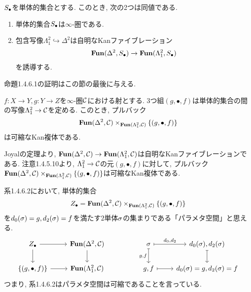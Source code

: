 \documentclass[uplatex, a4paper, 14Q, dvipdfmx]{jsreport}
\begin{document}
\begin{theorem}[Joyal]
  $\S$を単体的集合とする. 
  このとき, 次の2つは同値である. 
  \begin{enumerate}
    \item 単体的集合$\S$は$\infty$-圏である. 
    \item 包含写像$\Lambda^2_1 \hookrightarrow \Delta^2$は自明なKanファイブレーション
    \begin{align*}
      \fun(\Delta^2,\S) \to \fun(\Lambda^2_1,\S)
    \end{align*}
    を誘導する.
  \end{enumerate}
\end{theorem}

命題1.4.6.1の証明はこの節の最後に与える. 

\begin{cor}
  $f: X \to Y, g: Y \to Z$を$\infty$-圏$\calC$における射とする. 
  3つ組$(g,\bullet,f)$は単体的集合の間の写像$\Lambda^2_1 \to \calC$を定める. 
  このとき, プルバック 
  \begin{align*}
    \fun(\Delta^2,\calC) \ti_{\fun(\Lambda^2_1,\calC)} \{(g,\bullet,f)\}
  \end{align*}
  は可縮なKan複体である.
\end{cor}

\begin{Proof}
  Joyalの定理より, $\fun(\Delta^2,\calC) \to \fun(\Lambda^2_1,\calC)$は自明なKanファイブレーションである.
  注意1.4.5.10より, $\Lambda^2_1 \to \calC$の元$(g,\bullet,f)$に対して, プルバック$\fun(\Delta^2,\calC) \ti_{\fun(\Lambda^2_1,\calC)} \{(g,\bullet,f)\}$は可縮なKan複体である.
\end{Proof}

\begin{remark}
  系1.4.6.2において, 単体的集合 
  \begin{align*}
    Z_\bullet=\fun(\Delta^2,\calC) \ti_{\fun(\Lambda^2_1,\calC)} \{(g,\bullet,f)\}
  \end{align*}
  を$d_0(\si)=g, d_2(\si)=f$を満たす$2$単体$\si$の集まりである「パラメタ空間」と思える.
  \[\begin{tikzcd}
    {Z_\bullet} & {\fun(\Delta^2,\calC)} && \si & {d_0(\si), d_2(\si)} \\
    {\{(g,\bullet,f)\}} & {\fun(\Lambda^2_1,\calC)} && {g,f} & {d_0(\si)=g, d_2(\si)=f}
    \arrow[from=1-1, to=1-2]
    \arrow[from=1-2, to=2-2]
    \arrow[from=1-1, to=2-1]
    \arrow[from=2-1, to=2-2]
    \arrow["{g,f}"', maps to, from=1-4, to=2-4]
    \arrow["{d_0,d_2}", maps to, from=1-4, to=1-5]
    \arrow[maps to, from=1-5, to=2-5]
    \arrow[maps to, from=2-4, to=2-5]
  \end{tikzcd}\]
  つまり, 系1.4.6.2はパラメタ空間は可縮であることを言っている. 
\end{remark}
\end{document}
